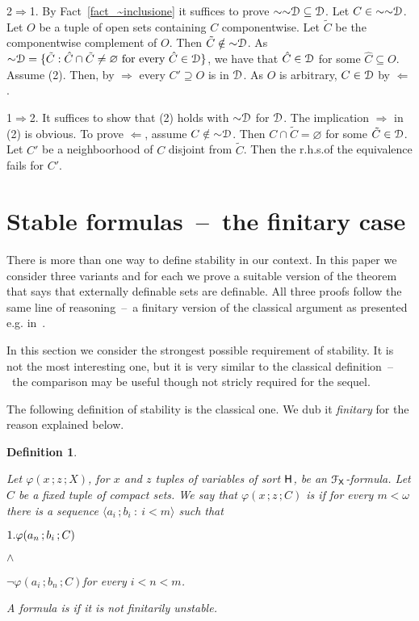 \documentclass{amsproc}
\makeatletter
\newcounter{thm}
\theoremstyle{mio}
\newtheorem{definition}[thm]{Definition}\tcolorboxenvironment{definition}{mythm}
\providecommand{\proofNameStyle}{\bfseries}
\renewenvironment{proof}[1][\proofname]{\par
  \pushQED{\qed}%
  \normalfont%
  \trivlist
  \item[\hskip\labelsep
        \proofNameStyle
    #1\@addpunct{.}]\ignorespaces
}{%
  \popQED\endtrivlist\@endpefalse
}
\renewcommand*{\emph}[1]{%
   \smash{\tikz[baseline]\node[rectangle, fill=teal!25, rounded corners, inner xsep=0.5ex, inner ysep=0.2ex, anchor=base, minimum height = 2.7ex]{\strut #1};}}
\makeatother
\begin{document}
\begin{proof}
  2$\Rightarrow$1.
  By Fact~\ref{fact_~inclusione} it suffices to prove ${\sim}{\sim}{\EuScript D}\subseteq{\EuScript D}$.
  Let $C\in{\sim}{\sim}{\EuScript D}$.
  Let $O$ be a tuple of open sets containing $C$ componentwise.
  Let $\tilde C$ be the componentwise complement of $O$.  
  Then $\tilde C\notin{\sim}{\EuScript D}$.
  As ${\sim}{\EuScript D}=\{\tilde C:  \hat C\cap\tilde C\neq\varnothing\text{ for every }\hat C\in{\EuScript D}\}$, we have that $\hat C\in{\EuScript D}$ for some $\hat C\subseteq O$.
  Assume (2).
  Then, by $\Rightarrow$ every $C'\supseteq O$ is in ${\EuScript D}$.
  As $O$ is arbitrary, $C\in {\EuScript D}$ by $\Leftarrow$.

  1$\Rightarrow$2.
  It suffices to show that (2) holds with ${\sim}{\EuScript D}$ for ${\EuScript D}$.
  The implication $\Rightarrow$ in (2) is obvious.
  To prove $\Leftarrow$, assume $C\notin{\sim}{\EuScript D}$.
  Then $C\cap\tilde C=\varnothing$ for some $\tilde C\in{\EuScript D}$.
  Let $C'$ be a neighboorhood of $C$ disjoint from $\tilde C$.
  Then the r.h.s.\@ of the equivalence fails for $C'$.  
\end{proof}


\section{Stable formulas~--~the finitary case}
\def\medrel#1{\parbox{5ex}{\hfil $#1$}}
\def\ceq#1#2#3{\parbox[t]{22ex}{$\displaystyle #1$}\medrel{#2}{$\displaystyle #3$}}

There is more than one way to define stability in our context.
In this paper we consider three variants and for each we prove a suitable version of the theorem that says that externally definable sets are definable.
All three proofs follow the same line of reasoning~--~a finitary version of the classical argument as presented e.g. in~\cite{Z?}.

In this section we consider the strongest possible requirement of stability.
It is not the most interesting one, but it is very similar to the classical definition~--~the comparison may be useful though not stricly required for the sequel.

The following definition of stability is the classical one.
We dub it \textit{finitary\/} for the reason explained below.

\begin{definition}\label{def_finitary_stable}\strut
  Let $\varphi(x\,;z\,;X)$, for $x$ and $z$ tuples of variables of sort ${\sf H}$, be an ${\EuScript F}_{\sf X}$-for\-mu\-la.  
  Let $C$ be a fixed tuple of compact sets.
  We say that $\varphi(x\,;z\,;C)$ is \emph{finitarily unstable\/} if for every $m<\omega$ there is a sequence $\langle a_i\,;b_i\ :\ i<m\rangle$ such that\smallskip

  \ceq{1.\hfill \varphi(a_n\,;b_i\,;C)}{\wedge}{\neg\varphi(a_i\,;b_n\,;C)}\hfill for every $i<n<m$.\smallskip

  A formula is \emph{finitary stable\/} if it is not finitarily unstable.
\end{definition}
\end{document}
